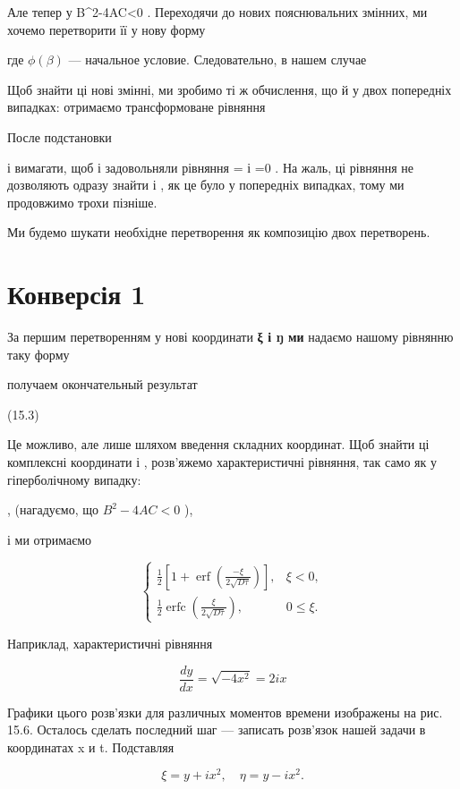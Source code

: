 \documentclass[
  ukrainian,
]{article}
\begin{document}
Але тепер у B\^{}2-4AC\textless0 . Переходячи до нових пояснювальних
змінних, ми хочемо перетворити її у нову форму

где \(\phi(\beta)\) --- начальное условие. Следовательно, в нашем случае

Щоб знайти ці нові змінні, ми зробимо ті ж обчислення, що й у двох
попередніх випадках: отримаємо трансформоване рівняння

После подстановки

і вимагати, щоб \xi і \eta задовольняли рівняння
= і =0 . На жаль, ці рівняння не
дозволяють одразу знайти \xi і \eta , як це було у попередніх випадках,
тому ми продовжимо трохи пізніше.

Ми будемо шукати необхідне перетворення як композицію двох перетворень.

\section{Конверсія
1}\label{ux43aux43eux43dux432ux435ux440ux441ux456ux44f-1}

За першим перетворенням у нові координати \textbf{ξ і ŋ ми} надаємо
нашому рівнянню таку форму

получаем окончательный результат

(15.3)

Це можливо, але лише шляхом введення складних координат. Щоб знайти ці
комплексні координати \xi і \eta , розв'яжемо характеристичні рівняння,
так само як у гіперболічному випадку:

, (нагадуємо, що \(B^2 - 4AC < 0\) ),

і ми отримаємо

\[
\begin{cases} \frac{1}{2} \left[ 1 + \operatorname{erf} \left( \frac{-\xi}{2\sqrt{D\tau}} \right) \right], & \xi < 0, \\ \frac{1}{2} \operatorname{erfc} \left( \frac{\xi}{2\sqrt{D\tau}} \right), & 0 \leq \xi. \end{cases}
\]

Наприклад, характеристичні рівняння

\[
\frac{dy}{dx} = \sqrt{-4x^2} = 2ix
\]

Графики цього розв'язки для различных моментов времени изображены на
рис. 15.6. Осталось сделать последний шаг --- записать розв'язок нашей
задачи в координатах x и t. Подставляя

\[
\xi = y + ix^2, \quad \eta = y - ix^2.
\]
\end{document}
